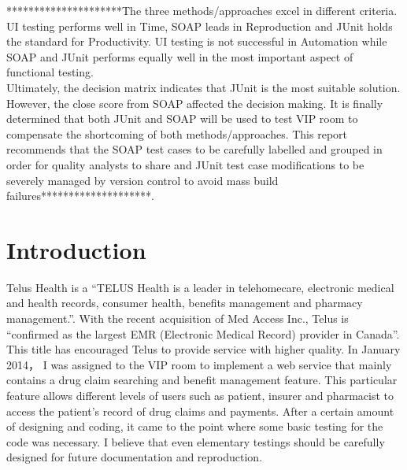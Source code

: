 \documentclass[12pt]{article}
\begin{document}
*********************The three methods/approaches excel in different criteria. UI testing performs well in Time, SOAP leads in Reproduction and JUnit holds the standard for Productivity. UI testing is not successful in Automation while SOAP and JUnit performs equally well in the most important aspect of functional testing.\\

Ultimately, the decision matrix indicates that JUnit is the most suitable solution. However, the close score from SOAP affected the decision making. It is finally determined that both JUnit and SOAP will be used to test VIP room to compensate the shortcoming of both methods/approaches. This report recommends that the SOAP test cases to be carefully labelled and grouped in order for quality analysts to share and JUnit test case modifications to be severely managed by version control to avoid mass build failures********************.\\



\newpage

\tableofcontents
\newpage
\listoffigures
\newpage
\listoftables
\newpage


\section{Introduction}

Telus Health is a “TELUS Health is a leader in telehomecare, electronic medical and health records, consumer health, benefits management and pharmacy management.”\cite{telusComp}. With the recent acquisition of Med Access Inc., Telus is “confirmed as the largest EMR (Electronic Medical Record) provider in Canada”\cite{telusComp}. This title has encouraged Telus to provide service with higher quality. In January 2014， I was assigned to the VIP room to implement a web service that mainly contains a drug claim searching and benefit management feature. This particular feature allows different levels of users such as patient, insurer and pharmacist to access the patient's record of drug claims and payments. After a certain amount of designing and coding, it came to the point where some basic testing for the code was necessary. I believe that even elementary testings should be carefully designed for future documentation and reproduction. \\
\end{document}
